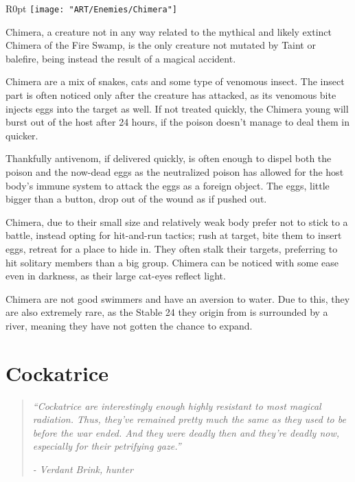 \documentclass[11pt,a4paper,twocolumn]{book}
\begin{document}
	\begin{wrapfigure}{R}{0pt}
		\texttt{[image: "ART/Enemies/Chimera"]}
	\end{wrapfigure}
	
	Chimera, a creature not in any way related to the mythical and likely extinct Chimera of the Fire Swamp, is the only creature not mutated by Taint or balefire, being instead the result of a magical accident.
	
	Chimera are a mix of snakes, cats and some type of venomous insect. The insect part is often noticed only after the creature has attacked, as its venomous bite injects eggs into the target as well. If not treated quickly, the Chimera young will burst out of the host after 24 hours, if the poison doesn't manage to deal them in quicker. 
	
	Thankfully antivenom, if delivered quickly, is often enough to dispel both the poison and the now-dead eggs as the neutralized poison has allowed for the host body's immune system to attack the eggs as a foreign object. The eggs, little bigger than a button, drop out of the wound as if pushed out.
	
	\bigskip
	Chimera, due to their small size and relatively weak body prefer not to stick to a battle, instead opting for hit-and-run tactics; rush at target, bite them to insert eggs, retreat for a place to hide in. They often stalk their targets, preferring to hit solitary members than a big group.
	Chimera can be noticed with some ease even in darkness, as their large cat-eyes reflect light. 
	
	Chimera are not good swimmers and have an aversion to water. Due to this, they are also extremely rare, as the Stable 24 they origin from is surrounded by a river, meaning they have not gotten the chance to expand.
	
	\clearpage
	
	\section*{Cockatrice}
	\begin{quote}
		\emph{``Cockatrice are interestingly enough highly resistant to most magical radiation. Thus, they've remained pretty much the same as they used to be before the war ended. And they were deadly then and they're deadly now, especially for their petrifying gaze.''}
		
		\emph{-	Verdant Brink, hunter}
	\end{quote}
	
\end{document}
